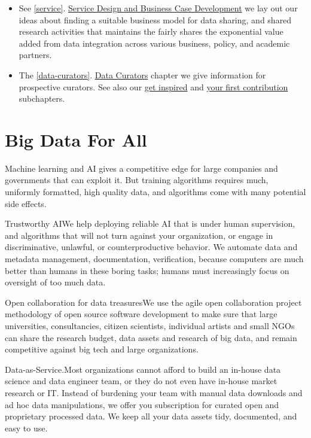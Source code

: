 \documentclass[
  a4paper,
  openany, a4paper, oneside]{book}
\begin{document}
\begin{itemize}
\item
  See \ref{service}. \protect\hyperlink{service}{Service Design and Business Case Development} we lay out our ideas about finding a suitable business model for data sharing, and shared research activities that maintains the fairly shares the exponential value added from data integration across various business, policy, and academic partners.
\item
  The \ref{data-curators}. \protect\hyperlink{data-curators}{Data Curators} chapter we give information for prospective curators. See also our \protect\hyperlink{get-inspired}{get inspired} and \protect\hyperlink{first-contribution}{your first contribution} subchapters.
\end{itemize}

\hypertarget{big-data-for-all-1}{%
\section*{Big Data For All}\label{big-data-for-all-1}}

Machine learning and AI gives a competitive edge for large companies and governments that can exploit it. But training algorithms requires much, uniformly formatted, high quality data, and algorithms come with many potential side effects.

Trustworthy AIWe help deploying reliable AI that is under human supervision, and algorithms that will not turn against your organization, or engage in discriminative, unlawful, or counterproductive behavior. We automate data and metadata management, documentation, verification, because computers are much better than humans in these boring tasks; humans must increasingly focus on oversight of too much data.

Open collaboration for data treasuresWe use the agile open collaboration project methodology of open source software development to make sure that large universities, consultancies, citizen scientists, individual artists and small NGOs can share the research budget, data assets and research of big data, and remain competitive against big tech and large organizations.

Data-as-Service.Most organizations cannot afford to build an in-house data science and data engineer team, or they do not even have in-house market research or IT. Instead of burdening your team with manual data downloads and ad hoc data manipulations, we offer you subscription for curated open and proprietary processed data. We keep all your data assets tidy, documented, and easy to use.
\end{document}
